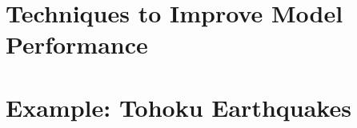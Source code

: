 \section{Techniques to Improve Model Performance} %



\section{Example: Tohoku Earthquakes} %





